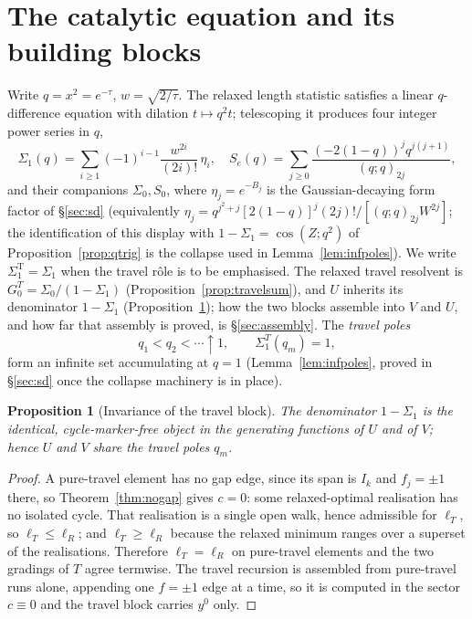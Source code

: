 \documentclass[11pt]{article}
\theoremstyle{plain}
\newtheorem{proposition}[theorem]{Proposition}
\theoremstyle{definition}
\theoremstyle{remark}
\begin{document}
\section{The catalytic equation and its building blocks}\label{sec:setup}

Write $q=x^2=e^{-\tau}$, $w=\sqrt{2/\tau}$. The relaxed length statistic satisfies a linear
$q$-difference equation with dilation $t\mapsto q^2t$; telescoping it produces four integer power
series in $q$,
\begin{equation}\label{eq:blocks}
  \Sigma_1(q)=\sum_{i\ge1}(-1)^{i-1}\frac{w^{2i}}{(2i)!}\,\eta_i,\quad
  S_e(q)=\sum_{j\ge0}\frac{(-2(1-q))^j q^{j(j+1)}}{(q;q)_{2j}},
\end{equation}
and their companions $\Sigma_0,S_0$, where $\eta_j=e^{-B_j}$ is the Gaussian-decaying form factor
of \S\ref{sec:sd} (equivalently $\eta_j=q^{j^2+j}[2(1-q)]^j(2j)!/[(q;q)_{2j}W^{2j}]$; the
identification of this display with $1-\Sigma_1=\cos(Z;q^2)$ of Proposition~\ref{prop:qtrig} is the
collapse used in Lemma~\ref{lem:infpoles}). We write $\Sigma_1^{\mathrm T}=\Sigma_1$ when the travel
r\^ole is to be emphasised. The relaxed travel resolvent is $G^T_0=\Sigma_0/(1-\Sigma_1)$
(Proposition~\ref{prop:travelsum}), and $U$ inherits its denominator $1-\Sigma_1$
(Proposition~\ref{prop:travelinv}); how the two blocks assemble into $V$ and $U$, and how far that
assembly is proved, is \S\ref{sec:assembly}. The \emph{travel poles}
\[
   q_1<q_2<\cdots\uparrow1,\qquad \Sigma_1^T(q_m)=1,
\]
form an infinite set accumulating at $q=1$ (Lemma~\ref{lem:infpoles}, proved in \S\ref{sec:sd}
once the collapse machinery is in place).

\begin{proposition}[Invariance of the travel block]\label{prop:travelinv}
The denominator $1-\Sigma_1$ is the identical, cycle-marker-free object in the generating functions
of $U$ and of $V$; hence $U$ and $V$ share the travel poles $q_m$.
\end{proposition}
\begin{proof}
A pure-travel element has no gap edge, since its span is $I_k$ and $f_j=\pm1$ there, so
Theorem~\ref{thm:nogap} gives $c=0$: some relaxed-optimal realisation has no isolated cycle. That
realisation is a single open walk, hence admissible for $\ell_T$, so $\ell_T\le\ell_R$; and
$\ell_T\ge\ell_R$ because the relaxed minimum ranges over a superset of the realisations. Therefore
$\ell_T=\ell_R$ on pure-travel elements and the two gradings of $T$ agree termwise. The travel
recursion is assembled from pure-travel runs alone, appending one $f=\pm1$ edge at a time, so it is
computed in the sector $c\equiv0$ and the travel block carries $y^0$ only.
\end{proof}
\end{document}
